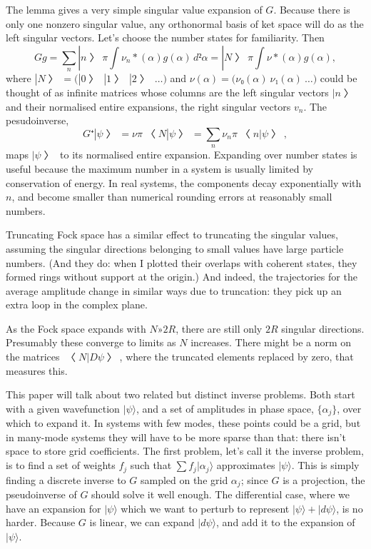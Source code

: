 The lemma gives a very simple singular value expansion of $G$.  Because there is only one nonzero singular value, any orthonormal basis of ket space will do as the left singular vectors.  Let's choose the number states for familiarity.  Then
$$Gg=∑_n |n〉π\int ν_n*(α)g(α)\,d²α=|N〉π\int ν*(α)g(α),$$
where $|N〉=\bigl(|0〉\ |1〉\ |2〉\ …\bigr)$ and $ν(α)=\bigl(ν₀(α)\ ν₁(α)\ …\bigr)$ could be thought of as infinite matrices whose columns are the left singular vectors $|n〉$ and their normalised entire expansions, the right singular vectors $v_n$.  The pesudoinverse, 
$$G⁺|ψ〉=νπ〈N|ψ〉= ∑_n ν_nπ〈n|ψ〉,$$
maps $|ψ〉$ to its normalised entire expansion.  Expanding over number states is useful because the maximum number in a system is usually limited by conservation of energy.  In real systems, the components decay exponentially with $n$, and become smaller than numerical rounding errors at reasonably small numbers.

Truncating Fock space has a similar effect to truncating the singular values, assuming the singular directions belonging to small values have large particle numbers.  (And they do: when I plotted their overlaps with coherent states, they formed rings without support at the origin.)  And indeed, the trajectories for the average amplitude change in similar ways due to truncation: they pick up an extra loop in the complex plane.

As the Fock space expands with $N»2R$, there are still only $2R$ singular directions.  Presumably these converge to limits as $N$ increases.  There might be a norm on the matrices $〈N|Dψ〉$, where the truncated elements replaced by zero, that measures this.


This paper will talk about two related but distinct inverse problems.  Both start with a given wavefunction $|ψ\rangle$, and a set of amplitudes in phase space, $\{α_j\}$, over which to expand it.  In systems with few modes, these points could be a grid, but in many-mode systems they will have to be more sparse than that: there isn't space to store grid coefficients.  The first problem, let's call it the inverse problem, is to find a set of weights $f_j$ such that $∑f_j|α_j\rangle$ approximates $|ψ\rangle$.  This is simply finding a discrete inverse to $G$ sampled on the grid $α_j$; since $G$ is a projection, the pseudoinverse of $G$ should solve it well enough.  The differential case, where we have an expansion for $|ψ\rangle$ which we want to perturb to represent $|ψ\rangle+|dψ\rangle$, is no harder.  Because $G$ is linear, we can expand $|dψ\rangle$, and add it to the expansion of $|ψ\rangle$.

